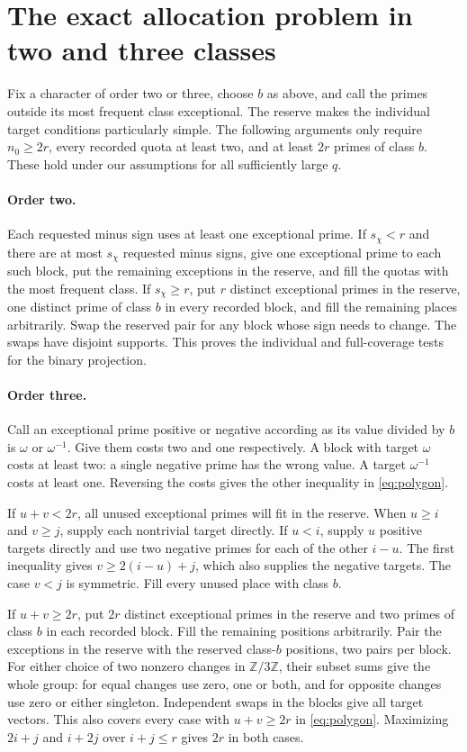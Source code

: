 \documentclass[11pt,letterpaper]{article}
\begin{document}
\section{The exact allocation problem in two and three classes}\label{sec:allocate}
Fix a character of order two or three, choose \(b\) as above, and call the primes outside its most frequent class exceptional. The reserve makes the individual target conditions particularly simple. The following arguments only require \(n_0\ge 2r\), every recorded quota at least two, and at least \(2r\) primes of class \(b\). These hold under our assumptions for all sufficiently large \(q\).

\paragraph{Order two.}
Each requested minus sign uses at least one exceptional prime. If \(s_\chi<r\) and there are at most \(s_\chi\) requested minus signs, give one exceptional prime to each such block, put the remaining exceptions in the reserve, and fill the quotas with the most frequent class. If \(s_\chi\ge r\), put \(r\) distinct exceptional primes in the reserve, one distinct prime of class \(b\) in every recorded block, and fill the remaining places arbitrarily. Swap the reserved pair for any block whose sign needs to change. The swaps have disjoint supports. This proves the individual and full-coverage tests for the binary projection.

\paragraph{Order three.}
Call an exceptional prime positive or negative according as its value divided by \(b\) is \(\omega\) or \(\omega^{-1}\). Give them costs two and one respectively. A block with target \(\omega\) costs at least two: a single negative prime has the wrong value. A target \(\omega^{-1}\) costs at least one. Reversing the costs gives the other inequality in \eqref{eq:polygon}.

If \(u+v<2r\), all unused exceptional primes will fit in the reserve. When \(u\ge i\) and \(v\ge j\), supply each nontrivial target directly. If \(u<i\), supply \(u\) positive targets directly and use two negative primes for each of the other \(i-u\). The first inequality gives \(v\ge 2(i-u)+j\), which also supplies the negative targets. The case \(v<j\) is symmetric. Fill every unused place with class \(b\).

If \(u+v\ge2r\), put \(2r\) distinct exceptional primes in the reserve and two primes of class \(b\) in each recorded block. Fill the remaining positions arbitrarily. Pair the exceptions in the reserve with the reserved class-\(b\) positions, two pairs per block. For either choice of two nonzero changes in \(\mathbb Z/3\mathbb Z\), their subset sums give the whole group: for equal changes use zero, one or both, and for opposite changes use zero or either singleton. Independent swaps in the blocks give all target vectors. This also covers every case with \(u+v\ge2r\) in \eqref{eq:polygon}. Maximizing \(2i+j\) and \(i+2j\) over \(i+j\le r\) gives \(2r\) in both cases.
\end{document}
